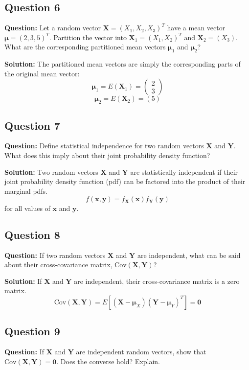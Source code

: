\subsection*{Question 6}
\textbf{Question:} Let a random vector $\mathbf{X} = (X_1, X_2, X_3)^T$ have a mean vector $\boldsymbol{\mu} = (2, 3, 5)^T$. Partition the vector into $\mathbf{X}_1 = (X_1, X_2)^T$ and $\mathbf{X}_2 = (X_3)$. What are the corresponding partitioned mean vectors $\boldsymbol{\mu}_1$ and $\boldsymbol{\mu}_2$?

\textbf{Solution:}
The partitioned mean vectors are simply the corresponding parts of the original mean vector:
$$ \boldsymbol{\mu}_1 = E(\mathbf{X}_1) = \begin{pmatrix} 2 \\ 3 \end{pmatrix} $$
$$ \boldsymbol{\mu}_2 = E(\mathbf{X}_2) = (5) $$

\subsection*{Question 7}
\textbf{Question:} Define statistical independence for two random vectors $\mathbf{X}$ and $\mathbf{Y}$. What does this imply about their joint probability density function?

\textbf{Solution:}
Two random vectors $\mathbf{X}$ and $\mathbf{Y}$ are statistically independent if their joint probability density function (pdf) can be factored into the product of their marginal pdfs.
$$ f(\mathbf{x}, \mathbf{y}) = f_{\mathbf{X}}(\mathbf{x}) f_{\mathbf{Y}}(\mathbf{y}) $$
for all values of $\mathbf{x}$ and $\mathbf{y}$.

\subsection*{Question 8}
\textbf{Question:} If two random vectors $\mathbf{X}$ and $\mathbf{Y}$ are independent, what can be said about their cross-covariance matrix, $\text{Cov}(\mathbf{X}, \mathbf{Y})$?

\textbf{Solution:}
If $\mathbf{X}$ and $\mathbf{Y}$ are independent, their cross-covariance matrix is a zero matrix.
$$ \text{Cov}(\mathbf{X}, \mathbf{Y}) = E[(\mathbf{X} - \boldsymbol{\mu}_X)(\mathbf{Y} - \boldsymbol{\mu}_Y)^T] = \mathbf{0} $$

\subsection*{Question 9}
\textbf{Question:} If $\mathbf{X}$ and $\mathbf{Y}$ are independent random vectors, show that $\text{Cov}(\mathbf{X}, \mathbf{Y}) = \mathbf{0}$. Does the converse hold? Explain.

